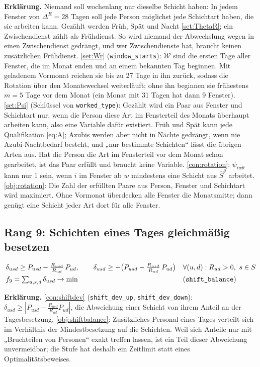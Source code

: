 \documentclass[11pt]{combiArticle}
\newcommand{\Wr}{\mathcal{W}}
\newcommand{\code}[1]{\texttt{#1}}
\begin{document}
\textbf{Erklärung.}
Niemand soll wochenlang nur dieselbe Schicht haben: In jedem Fenster von $\Delta^{R} = 28$ Tagen soll jede Person
möglichst jede Schichtart haben, die sie arbeiten kann. Gezählt werden Früh, Spät und Nacht \eqref{set:ThetaR};
ein Zwischendienst zählt als Frühdienst. So wird niemand der Abwechslung wegen in einen Zwischendienst gedrängt,
und wer Zwischendienste hat, braucht keinen zusätzlichen Frühdienst.
\eqref{set:Wr} (\code{window\_starts}): $\Wr$ sind die ersten Tage aller Fenster, die im Monat enden und an
einem bekannten Tag beginnen. Mit geladenem Vormonat reichen sie bis zu 27 Tage in ihn zurück, sodass die
Rotation über den Monatswechsel weiterläuft; ohne ihn beginnen sie frühestens $m = 5$ Tage vor dem Monat (ein
Monat mit 31 Tagen hat dann 9 Fenster).
\eqref{set:Psi} (Schlüssel von \code{worked\_type}): Gezählt wird ein Paar aus Fenster und Schichtart nur, wenn die
Person diese Art im Fensterteil des Monats überhaupt arbeiten kann, also eine Variable dafür existiert. Früh und
Spät kann jede Qualifikation \eqref{eq:A}; Azubis werden aber nicht in Nächte gedrängt, wenn nie
Azubi-Nachtbedarf besteht, und „nur bestimmte Schichten“ lässt die übrigen Arten aus. Hat die Person die Art im Fensterteil vor dem Monat schon gearbeitet, ist das Paar erfüllt und
braucht keine Variable.
\eqref{con:rotation}: $\psi_{iw\theta}$ kann nur 1 sein, wenn $i$ im Fenster ab $w$ mindestens eine Schicht aus
$\bar S^{\theta}$ arbeitet.
\eqref{obj:rotation}: Die Zahl der erfüllten Paare aus Person, Fenster und Schichtart wird maximiert. Ohne
Vormonat überdecken alle Fenster die Monatsmitte; dann genügt eine Schicht jeder Art dort für alle Fenster.

\subsection{Rang 9: Schichten eines Tages gleichmäßig besetzen}\label{sec:z:schichten}

\begin{align}
  & \delta_{usd} \ge P_{usd} - \tfrac{R_{usd}}{R_{ud}}\, P_{ud},\qquad
    \delta_{usd} \ge -\bigl(P_{usd} - \tfrac{R_{usd}}{R_{ud}}\, P_{ud}\bigr) && \forall (u,d) : R_{ud} > 0,\ s \in S \label{con:shiftdev}\\
  & f_9 = \textstyle\sum_{u,s,d} \delta_{usd} \to \min && \text{(\code{shift\_balance})} \label{obj:shiftbalance}
\end{align}

\textbf{Erklärung.}
\eqref{con:shiftdev} (\code{shift\_dev\_up}, \code{shift\_dev\_down}): $\delta_{usd} \ge |P_{usd} -
\frac{R_{usd}}{R_{ud}} P_{ud}|$, die Abweichung einer Schicht von ihrem Anteil an der Tagesbesetzung.
\eqref{obj:shiftbalance}: Zusätzliches Personal eines Tages verteilt sich im Verhältnis der Mindestbesetzung auf
die Schichten. Weil sich Anteile nur mit „Bruchteilen von Personen“ exakt treffen lassen, ist ein Teil dieser
Abweichung unvermeidbar; die Stufe hat deshalb ein Zeitlimit statt eines Optimalitätsbeweises.
\end{document}
